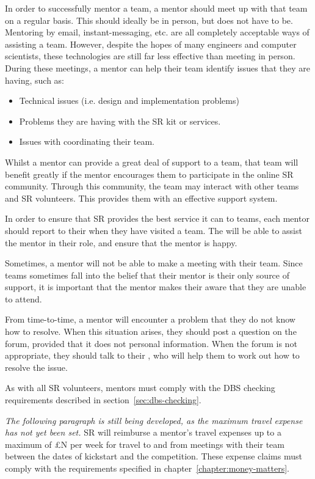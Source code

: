 In order to successfully mentor a team, a mentor should meet up with that team on a regular basis.  This should ideally be in person, but does not have to be.  Mentoring by email, instant-messaging, etc. are all completely acceptable ways of assisting a team.  However, despite the hopes of many engineers and computer scientists, these technologies are still far less effective than meeting in person.  During these meetings, a mentor can help their team identify issues that they are having, such as:
\begin{itemize}
\item Technical issues (i.e. design and implementation problems)
\item Problems they are having with the SR kit or services.
\item Issues with coordinating their team.
\end{itemize}

Whilst a mentor can provide a great deal of support to a team, that team will benefit greatly if the mentor encourages them to participate in the online SR community.  Through this community, the team may interact with other teams and SR volunteers.  This provides them with an effective support system.

In order to ensure that SR provides the best service it can to teams, each mentor should report to their  when they have visited a team.  The  will be able to assist the mentor in their role, and ensure that the mentor is happy.

Sometimes, a mentor will not be able to make a meeting with their team.  Since teams sometimes fall into the belief that their mentor is their only source of support, it is important that the mentor makes their  aware that they are unable to attend.

From time-to-time, a mentor will encounter a problem that they do not know how to resolve.  When this situation arises, they should post a question on the forum, provided that it does not personal information.  When the forum is not appropriate, they should talk to their , who will help them to work out how to resolve the issue.

As with all SR volunteers, mentors must comply with the DBS checking requirements described in section~\ref{sec:dbs-checking}.

\textit{The following paragraph is still being developed, as the maximum travel expense has not yet been set.}  SR will reimburse a mentor's travel expenses up to a maximum of {\pounds}N per week for travel to and from meetings with their team between the dates of kickstart and the competition.  These expense claims must comply with the requirements specified in chapter~\ref{chapter:money-matters}.

